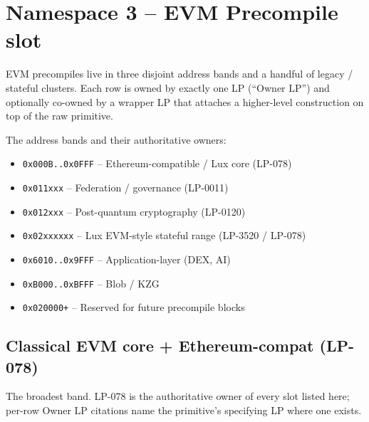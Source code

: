 \section{Namespace 3 -- EVM Precompile slot}
\label{sec:precompile}

EVM precompiles live in three disjoint address bands and a handful
of legacy / stateful clusters. Each row is owned by exactly one LP
(``Owner LP'') and optionally co-owned by a wrapper LP that attaches
a higher-level construction on top of the raw primitive.

The address bands and their authoritative owners:

\begin{itemize}[leftmargin=2em,nosep]
\item \texttt{0x000B..0x0FFF} -- Ethereum-compatible / Lux core (LP-078)
\item \texttt{0x011xxx} -- Federation / governance (LP-0011)
\item \texttt{0x012xxx} -- Post-quantum cryptography (LP-0120)
\item \texttt{0x02xxxxxx} -- Lux EVM-style stateful range (LP-3520 / LP-078)
\item \texttt{0x6010..0x9FFF} -- Application-layer (DEX, AI)
\item \texttt{0xB000..0xBFFF} -- Blob / KZG
\item \texttt{0x020000+} -- Reserved for future precompile blocks
\end{itemize}

\subsection{Classical EVM core + Ethereum-compat (LP-078)}

The broadest band. LP-078 is the authoritative owner of every slot
listed here; per-row Owner LP citations name the primitive's
specifying LP where one exists.

